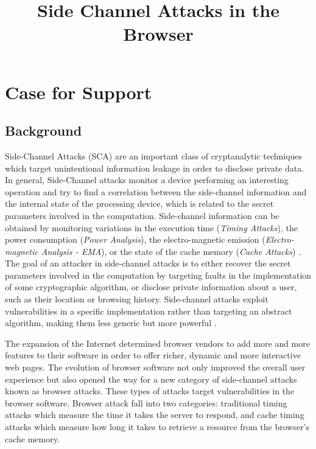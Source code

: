 \documentclass[a4paper,11pt]{article}
\title{Side Channel Attacks in the Browser}
\date{}
\begin{document}
\maketitle

\section*{Case for Support}


\subsection*{Background}
Side-Channel Attacks (SCA) are an important class of cryptanalytic techniques which target unintentional information leakage in order to disclose private data. In general, Side-Channel attacks monitor a device performing an interesting operation and try to find a correlation between the side-channel information and the internal state of the processing device, which is related to the secret parameters involved in the computation. Side-channel information can be obtained by monitoring variations in the execution time (\textit{Timing Attacks}), the power consumption (\textit{Power Analysis}), the electro-magnetic emission (\textit{Electro-magnetic Analysis - EMA}), or the state of the cache memory (\textit{Cache Attacks}) \cite{standaert2010introduction}. The goal of an attacker in side-channel attacks is to either recover the secret parameters involved in the computation by targeting faults in the implementation of some cryptographic algorithm, or disclose private information about a user, such as their location or browsing history. Side-channel attacks exploit vulnerabilities in a specific implementation rather than targeting an abstract algorithm, making them less generic but more powerful \cite{standaert2010introduction}.

The expansion of the Internet determined browser vendors to add more and more features to their software in order to offer richer, dynamic and more interactive web pages. The evolution of browser software not only improved the overall user experience but also opened the way for a new category of side-channel attacks known as browser attacks. These types of attacks target vulnerabilities in the browser software. Browser attack fall into two categories: traditional timing attacks which measure the time it takes the server to respond, and cache timing attacks which measure how long it takes to retrieve a resource from the browser's cache memory.
\end{document}
